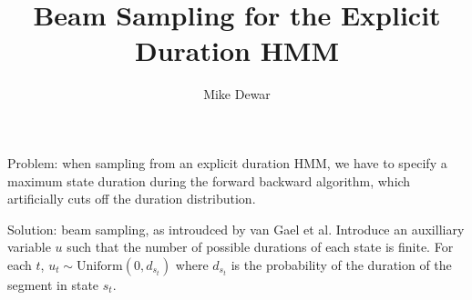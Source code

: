 \documentclass{article}
\title{Beam Sampling for the Explicit Duration HMM}
\author{Mike Dewar}
\begin{document}
    
    Problem: when sampling from an explicit duration HMM, we have to specify a maximum state duration during the forward backward algorithm, which artificially cuts off the duration distribution.
    
    Solution: beam sampling, as introudced by van Gael et al. Introduce an auxilliary variable $u$ such that the number of possible durations of each state is finite. For each $t$, $u_t \sim \mathrm{Uniform}(0,d_{s_t})$ where $d_{s_t}$ is the probability of the duration of the segment in state $s_t$. 
\end{document}
